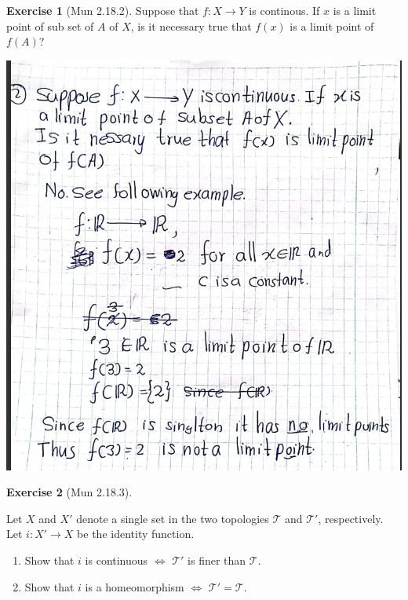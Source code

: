 \documentclass[
]{book}
\theoremstyle{definition}
\theoremstyle{definition}
\theoremstyle{definition}
\newtheorem{exercise}{Exercise}[chapter]
\theoremstyle{definition}
\theoremstyle{remark}
\begin{document}
\begin{exercise}[Mun 2.18.2]
\protect\hypertarget{exr:unnamed-chunk-187}{}\label{exr:unnamed-chunk-187}Suppose that \(f:X\to Y\) is continous. If \(x\) is a limit point of sub set of \(A\) of \(X\), is it necessary true that \(f(x)\) is a limit point of \(f(A)\)?
\end{exercise}

\includegraphics{figures/Exercises/Ex 2.18/ex-2.png}

\begin{exercise}[Mun 2.18.3]
\protect\hypertarget{exr:unnamed-chunk-189}{}\label{exr:unnamed-chunk-189}\leavevmode

Let \(X\) and \(X'\) denote a single set in the two topologies \(\mathcal{T}\) and \(\mathcal{T}'\), respectively.
Let \(i : X' \rightarrow X\) be the identity function.

\begin{enumerate}
\item Show that $i$ is continuous $\Leftrightarrow$ $\mathcal{T}'$ is finer than $\mathcal{T}$.
\item Show that $i$ is a homeomorphism $\Leftrightarrow$ $\mathcal{T}' = \mathcal{T}$.
\end{enumerate}

\end{exercise}
\end{document}
